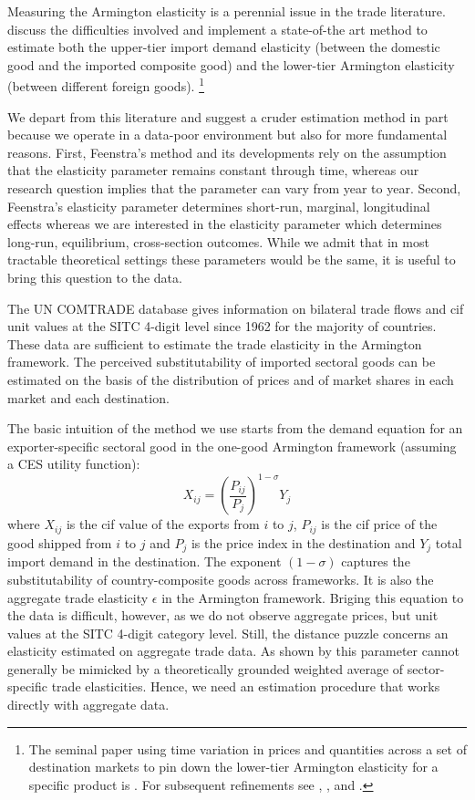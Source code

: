 \documentclass[12pt,twoside,a4paper,notitlepage]{article}
\begin{document}
Measuring the Armington elasticity is a perennial issue in the trade literature. 
\cite{Feenstra2018} discuss the difficulties involved and implement a state-of-the art method to estimate both the upper-tier import demand elasticity (between the domestic good and the imported composite good) and the lower-tier Armington elasticity (between different foreign goods).
\footnote{The seminal paper using time variation in prices and quantities across a set of destination markets to pin down the lower-tier Armington elasticity for a specific product is \cite{Feenstra1994}. For subsequent refinements see \cite{Broda2006b}, \cite{Imbs2015}, and \cite{Soderbery2015}.}

We depart from this literature and suggest a cruder estimation method in part because we operate in a data-poor environment but also for more fundamental reasons.
First, Feenstra's method and its developments rely on the assumption that the elasticity parameter remains constant through time, whereas our research question implies that the parameter can vary from year to year.
Second, Feenstra's elasticity parameter determines short-run, marginal, longitudinal effects whereas we are interested in the elasticity parameter which determines long-run, equilibrium, cross-section outcomes.
While we admit that in most tractable theoretical settings these parameters would be the same, it is useful to bring this question to the data.

The UN COMTRADE database gives information on bilateral trade flows and cif unit values at the SITC 4-digit level since 1962 for the majority of countries.
These data are sufficient to estimate the trade elasticity in the Armington framework.
The perceived substitutability of imported sectoral goods can be estimated on the basis of the distribution of prices and of market shares in each market and each destination.

The basic intuition of the method we use starts from the demand equation for an exporter-specific sectoral good in the one-good Armington framework (assuming a CES utility function):
\[{{X}_{ij}}={{\left( \frac{{{P}_{ij}}}{{{P}_{j}}} \right)}^{1-\sigma}}{{Y}_{j}}\]
where ${X}_{ij}$ is the cif value of the exports from $i$ to $j$, ${{P}_{ij}}$ is the cif price of the good shipped from $i$ to $j$ and ${{P}_{j}}$ is the price index in the destination and ${{Y}_{j}}$ total import demand in the destination.
The exponent $\left( 1-\sigma \right)$ captures the substitutability of country-composite goods across frameworks.
It is also the aggregate trade elasticity $\epsilon $ in the Armington framework.
Briging this equation to the data is difficult, however, as we do not observe aggregate prices, but unit values at the SITC 4-digit category level.
Still, the distance puzzle concerns an elasticity estimated on aggregate trade data.
As shown by \cite{Imbs2015} this parameter cannot generally be mimicked by a theoretically grounded weighted average of sector-specific trade elasticities.
Hence, we need an estimation procedure that works directly with aggregate data.
\end{document}
